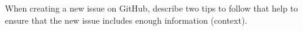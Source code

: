 \documentclass[12pt,fleqn]{examtst}
\begin{document}

\newpage
\noindent
\begin{minipage}{\textwidth}

When creating a new issue on GitHub, describe two tips to follow that help to ensure that the new issue includes enough information (context).

\rule{0cm}{7cm}



\rule{0cm}{7cm}

\end{minipage}


\newpage
\noindent
\begin{minipage}{\textwidth}



\rule{0cm}{7cm}



\rule{0cm}{7cm}

\end{minipage}
\end{document}
